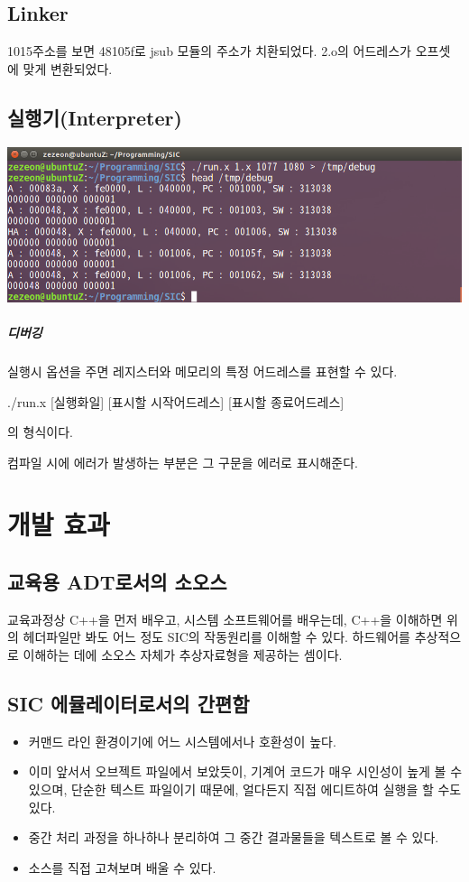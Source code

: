 \documentclass[12pt,a4paper]{report}
\begin{document}

\section{Linker}

1015주소를 보면 48105f로 jsub 모듈의 주소가 치환되었다. 
2.o의 어드레스가 오프셋에 맞게 변환되었다.
\section{실행기(Interpreter)}
\includegraphics[width=\textwidth]{debug.png}

\paragraph{디버깅}
실행시 옵션을 주면 레지스터와 메모리의 특정 어드레스를 표현할 수 있다.

./run.x [실행화일] [표시할 시작어드레스] [표시할 종료어드레스]

의 형식이다.

컴파일 시에 에러가 발생하는 부분은 그 구문을 에러로 표시해준다.
\chapter{개발 효과}
\section{교육용 ADT로서의 소오스}


교육과정상 C++을 먼저 배우고, 시스템 소프트웨어를 배우는데, C++을 이해하면 위의 헤더파일만 봐도 어느 정도 SIC의 작동원리를 이해할 수 있다.
하드웨어를 추상적으로 이해하는 데에 소오스 자체가 추상자료형을 제공하는 셈이다.
\section{SIC 에뮬레이터로서의 간편함}
\begin{itemize}
\item 커맨드 라인 환경이기에 어느 시스템에서나 호환성이 높다.
\item 이미 앞서서 오브젝트 파일에서 보았듯이, 기계어 코드가 매우 시인성이 높게 볼 수 있으며, 단순한 텍스트 파일이기 때문에, 얼다든지 직접 에디트하여 실행을 할 수도 있다.
\item 중간 처리 과정을 하나하나 분리하여 그 중간 결과물들을 텍스트로 볼 수 있다.
\item 소스를 직접 고쳐보며 배울 수 있다.
\end{itemize}
\end{document}
